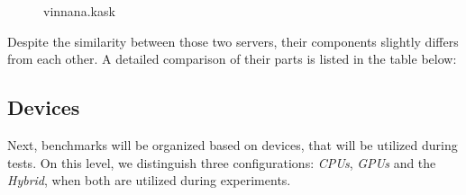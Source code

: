 \begin{figure}[hbt!]
\begin{minipage}[t]{0.21\textwidth}
        \caption{vinnana.kask}\label{fig:vinnana.kask}
    \end{minipage}
\end{figure}

Despite the similarity between those two servers, their components slightly
differs from each other. A detailed comparison of their parts is listed in the
table below:



\newpage

\subsection{Devices}
Next, benchmarks will be organized based on devices,
that will be utilized during tests. On this level, we distinguish three
configurations: \emph{CPUs}, \emph{GPUs} and the \emph{Hybrid}, when both
are utilized during experiments. 

